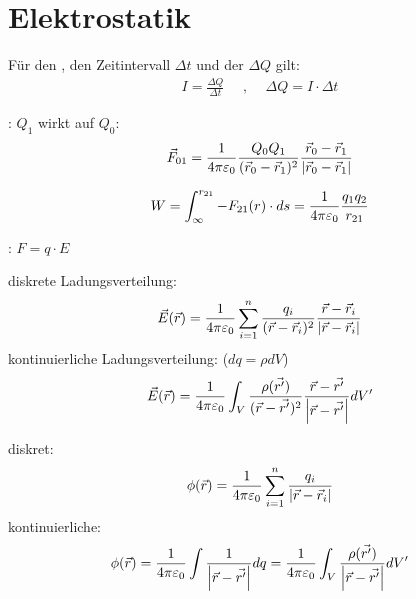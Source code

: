 \section{Elektrostatik}

Für den , den Zeitintervall $\Delta t$ und der 
$\Delta Q$ gilt: 
\begin{align*}
    I = \frac{\Delta Q}{\Delta t}
    \quad \text{  ,  } \quad
    \Delta Q = I \cdot \Delta t
\end{align*}

\vspace{1\baselineskip}

:
$Q_1$ wirkt auf $Q_0$:
\begin{align*}
    \vec{F}_{01} = \frac{1}{4 \pi \varepsilon_0} \frac{Q_0 Q_1}{(\vec{r}_0 - \vec{r}_1)^2}
                    \frac{\vec{r}_0 - \vec{r}_1}{\left\vert \vec{r}_0 - \vec{r}_1 \right\vert}
\end{align*}

\vspace{1\baselineskip}

\begin{align*}
    W = \int_{\infty}^{r_{21}} - F_{21} (r) \cdot ds = \frac{1}{4 \pi \varepsilon_0} \frac{q_1 q_2}{r_{21}}
\end{align*}

\vspace{1\baselineskip}

: $F = q \cdot E$

diskrete Ladungsverteilung:
\begin{align*}
    \vec{E} (\vec{r}) = \frac{1}{4 \pi \varepsilon_0} \sum_{i=1}^n \frac{q_i}{(\vec{r} -\vec{r}_i)^2} \frac{\vec{r} - \vec{r}_i}{\left\vert \vec{r} - \vec{r}_i \right\vert}
\end{align*}
kontinuierliche Ladungsverteilung: ($dq = \rho dV$)
\begin{align*}
    \vec{E} (\vec{r}) = \frac{1}{4 \pi \varepsilon_0} \int_V \frac{\rho (\vec{r'})}{(\vec{r}-\vec{r'})^2} \frac{\vec{r} - \vec{r'}}{\left\vert \vec{r}-\vec{r'} \right\vert} dV'
\end{align*}

\vspace{1\baselineskip}


diskret:
\begin{align*}
    \phi (\vec{r}) = \frac{1}{4 \pi \varepsilon_0} \sum_{i=1}^n \frac{q_i}{\left\vert \vec{r}-\vec{r}_i \right\vert}
\end{align*}
kontinuierliche:
\begin{align*}
    \phi (\vec{r}) = \frac{1}{4 \pi \varepsilon_0} \int \frac{1}{\left\vert \vec{r}-\vec{r'} \right\vert} dq
    = \frac{1}{4 \pi \varepsilon_0} \int_V \frac{\rho (\vec{r'})}{\left\vert \vec{r}-\vec{r'} \right\vert} dV'
\end{align*}

